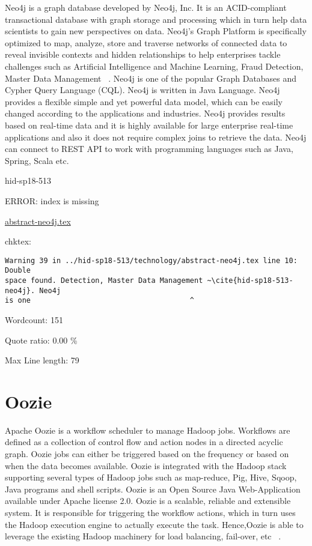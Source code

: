 Neo4j is a graph database developed by Neo4j, Inc. It is an
ACID-compliant transactional database with graph storage and
processing which in turn help data scientists to gain new perspectives
on data. Neo4j's Graph Platform is specifically optimized to map,
analyze, store and traverse networks of connected data to reveal
invisible contexts and hidden relationships to help enterprises tackle
challenges such as Artificial Intelligence and Machine Learning, Fraud
Detection, Master Data Management ~\cite{hid-sp18-513-neo4j}. Neo4j is one 
of the popular Graph Databases and Cypher Query Language (CQL). 
Neo4j is written in Java Language. Neo4j provides a flexible simple and yet 
powerful data model, which can be easily changed according to the applications 
and industries. Neo4j provides results based on real-time data and it is highly
available for large enterprise real-time applications and also it does not 
require complex joins to retrieve the data. Neo4j can connect to REST API to 
work with programming languages such as Java, Spring, Scala etc.


\begin{IU}

hid-sp18-513

ERROR: index is missing

\href{https://github.com/cloudmesh-community/hid-sp18-513/blob/master//technology/abstract-neo4j.tex}{abstract-neo4j.tex}

 
chktex:
\begin{tiny}
\begin{verbatim}
Warning 39 in ../hid-sp18-513/technology/abstract-neo4j.tex line 10: Double
space found. Detection, Master Data Management ~\cite{hid-sp18-513-neo4j}. Neo4j
is one                                     ^
\end{verbatim}
\end{tiny}

Wordcount: 151


Quote ratio: 0.00 \%
 
Max Line length: 79
\end{IU}

\section{Oozie}
Apache Oozie is a workflow scheduler to manage Hadoop jobs. Workflows are 
defined as a collection of control flow and action nodes in a directed 
acyclic graph. Oozie jobs can either be triggered based on the frequency 
or based on when the data becomes available. Oozie is integrated with the 
Hadoop stack supporting several types of Hadoop jobs such as map-reduce, Pig,
Hive, Sqoop, Java programs and shell scripts. Oozie is an Open Source Java 
Web-Application available under Apache license 2.0. Oozie is a scalable, 
reliable and extensible system. It is responsible for triggering the workflow 
actions, which in turn uses the Hadoop execution engine to actually execute 
the task. Hence,Oozie is able to leverage the existing Hadoop machinery for
load balancing, fail-over, etc ~\cite{hid-sp18-513-oozie}.


